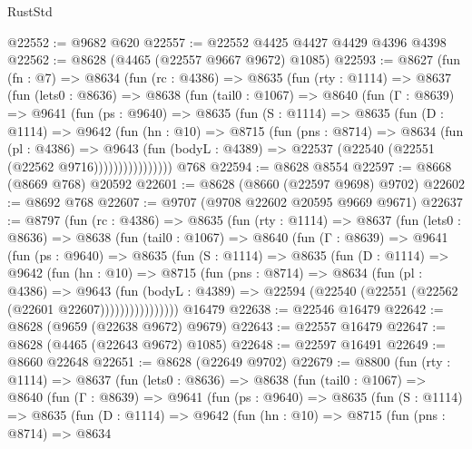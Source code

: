 \begin{lexlean}{RustStd}
\begin{coremodule}
@22552 := @9682 @620
@22557 := @22552 @4425 @4427 @4429 @4396 @4398
@22562 := @8628 (@4465 (@22557 @9667 @9672) @1085)
@22593 := @8627
    (fun (fn : @7) =>
    @8634
      (fun (rc : @4386) =>
      @8635
        (fun (rty : @1114) =>
        @8637
          (fun (lets0 : @8636) =>
          @8638
            (fun (tail0 : @1067) =>
            @8640
              (fun (Γ : @8639) =>
              @9641
                (fun (ps : @9640) =>
                @8635
                  (fun (S : @1114) =>
                  @8635
                    (fun (D : @1114) =>
                    @9642
                      (fun (hn : @10) =>
                      @8715
                        (fun (pns : @8714) =>
                        @8634
                          (fun (pl : @4386) =>
                          @9643
                            (fun (bodyL : @4389) =>
                            @22537 (@22540 (@22551 (@22562 @9716))))))))))))))))
    @768
@22594 := @8628 @8554
@22597 := @8668 (@8669 @768) @20592
@22601 := @8628 (@8660 (@22597 @9698) @9702)
@22602 := @8692 @768
@22607 := @9707 (@9708 @22602 @20595 @9669 @9671)
@22637 := @8797
    (fun (rc : @4386) =>
    @8635
      (fun (rty : @1114) =>
      @8637
        (fun (lets0 : @8636) =>
        @8638
          (fun (tail0 : @1067) =>
          @8640
            (fun (Γ : @8639) =>
            @9641
              (fun (ps : @9640) =>
              @8635
                (fun (S : @1114) =>
                @8635
                  (fun (D : @1114) =>
                  @9642
                    (fun (hn : @10) =>
                    @8715
                      (fun (pns : @8714) =>
                      @8634
                        (fun (pl : @4386) =>
                        @9643
                          (fun (bodyL : @4389) =>
                          @22594 (@22540 (@22551 (@22562 (@22601 @22607))))))))))))))))
    @16479
@22638 := @22546 @16479
@22642 := @8628 (@9659 (@22638 @9672) @9679)
@22643 := @22557 @16479
@22647 := @8628 (@4465 (@22643 @9672) @1085)
@22648 := @22597 @16491
@22649 := @8660 @22648
@22651 := @8628 (@22649 @9702)
@22679 := @8800
    (fun (rty : @1114) =>
    @8637
      (fun (lets0 : @8636) =>
      @8638
        (fun (tail0 : @1067) =>
        @8640
          (fun (Γ : @8639) =>
          @9641
            (fun (ps : @9640) =>
            @8635
              (fun (S : @1114) =>
              @8635
                (fun (D : @1114) =>
                @9642
                  (fun (hn : @10) =>
                  @8715
                    (fun (pns : @8714) =>
                    @8634

\end{coremodule}
\end{lexlean}
